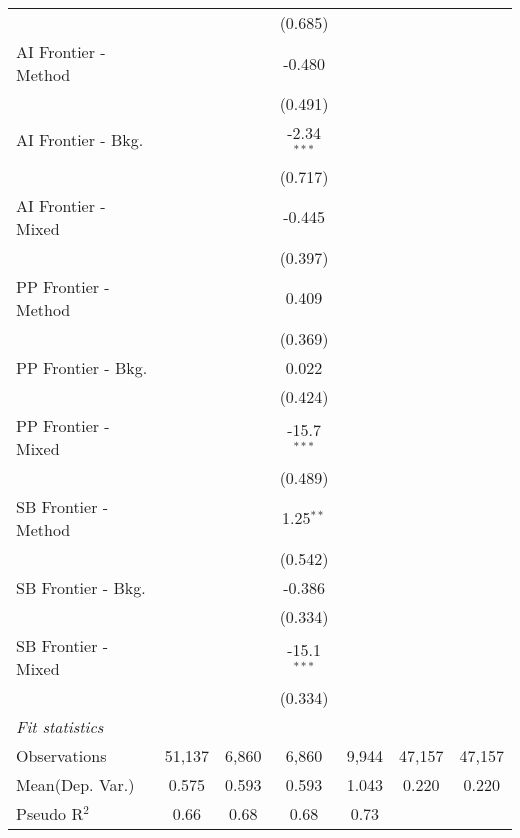 \begin{tabular}{lcccccc}
                        &              &               & (0.685)       &             &        &   \\   
   AI Frontier - Method &              &               & -0.480        &             &        &   \\   
                        &              &               & (0.491)       &             &        &   \\   
   AI Frontier - Bkg.   &              &               & -2.34$^{***}$ &             &        &   \\   
                        &              &               & (0.717)       &             &        &   \\   
   AI Frontier - Mixed  &              &               & -0.445        &             &        &   \\   
                        &              &               & (0.397)       &             &        &   \\   
   PP Frontier - Method &              &               & 0.409         &             &        &   \\   
                        &              &               & (0.369)       &             &        &   \\   
   PP Frontier - Bkg.   &              &               & 0.022         &             &        &   \\   
                        &              &               & (0.424)       &             &        &   \\   
   PP Frontier - Mixed  &              &               & -15.7$^{***}$ &             &        &   \\   
                        &              &               & (0.489)       &             &        &   \\   
   SB Frontier - Method &              &               & 1.25$^{**}$   &             &        &   \\   
                        &              &               & (0.542)       &             &        &   \\   
   SB Frontier - Bkg.   &              &               & -0.386        &             &        &   \\   
                        &              &               & (0.334)       &             &        &   \\   
   SB Frontier - Mixed  &              &               & -15.1$^{***}$ &             &        &   \\   
                        &              &               & (0.334)       &             &        &   \\   
   \midrule
   \emph{Fit statistics}\\
   Observations         & 51,137       & 6,860         & 6,860         & 9,944       & 47,157 & 47,157\\  
Mean(Dep. Var.) & 0.575 & 0.593 & 0.593 & 1.043 & 0.220 & 0.220 \\
   Pseudo R$^2$         & 0.66         & 0.68          & 0.68          & 0.73        &        & \\  
   

\end{tabular}
